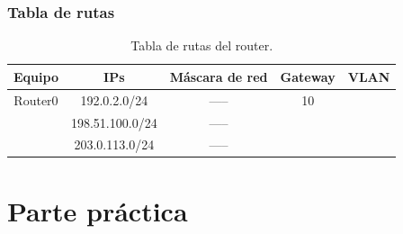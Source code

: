 \documentclass[spanish,12pt,letterpaper]{article}
\begin{document}
\subsubsection{Tabla de rutas}


\begin{table}[H]
  \centering
  \begin{tabular}{| c | c | c | c | c |}\hline
    Equipo & IPs & Máscara de red & Gateway & VLAN \\ \hline
    Router0 & 192.0.2.0/24 & ----- & 10 & \\
    & 198.51.100.0/24 & ----- &  & \\
    & 203.0.113.0/24 & ----- &  & \\\hline
  \end{tabular}
  \caption{Tabla de rutas del router.}
\end{table}
\section{Parte práctica}
\end{document}
